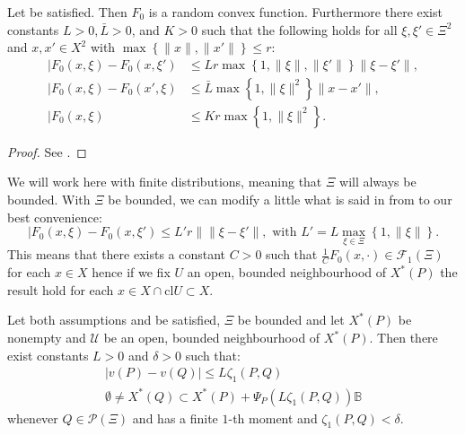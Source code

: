 \documentclass{amsart}
\begin{document}
\begin{proposition}\label{prop 2}
    Let  be satisfied. Then $F_0$ is a random convex function. Furthermore there exist constants $L>0, \bar{L}>0$, and $K>0$ such that the following holds for all $\xi,\xi'\in\Xi^2$ and $x,x'\in X^2$ with $\max\left\{\lVert x\rVert, \lVert x' \rVert\right\}\leq r$:
    \begin{align}
        \lvert F_0\left(x,\xi\right)- F_0\left(x,\xi'\right) &\leq Lr\max\left\{1,\lVert \xi\rVert, \lVert \xi'\rVert\right\}\lVert \xi-\xi'\rVert, \label{lips}\\
        \lvert F_0\left(x,\xi\right)- F_0\left(x',\xi\right) &\leq \bar{L}\max\left\{1,\lVert\xi\rVert^2\right\}\lVert x-x'\rVert, \\
        \lvert F_0\left(x,\xi\right) &\leq Kr\max\left\{1,\lVert\xi\rVert^2\right\}.
    \end{align}
     
\end{proposition}
\begin{proof}
    See \cite[Proposition 22]{romisch_stability_2003}.
\end{proof}
We will work here with finite distributions, meaning that $\Xi$ will always be bounded. With $\Xi$ be bounded, we can modify a little what is said in  from  to our best convenience:
$$
\lvert F_0\left(x,\xi\right)- F_0\left(x,\xi'\right) \leq L'r \lVert \lVert \xi-\xi'\rVert, \text{ with } L'=L\max_{\xi\in\Xi}\left\{1,\lVert\xi\rVert\right\}.
$$
This means that there exists a constant $C>0$ such that $\frac{1}{C}F_0\left(x,\cdot\right)\in\mathcal{F}_1\left(\Xi\right)$ for each $x\in X$ hence if we fix $U$ an open, bounded neighbourhood of $X^*\left(P\right)$ the result hold for each $x\in X\cap \text{cl}U\subset X$. 
\begin{corollary}
    Let both assumptions  and  be satisfied, $\Xi$ be bounded and let $X^*\left(P\right)$ be nonempty and $\mathcal{U}$ be an open, bounded neighbourhood of $X^*\left(P\right).$ Then there exist constants $L>0$ and $\delta >0$ such that:
    \begin{align*}
        \lvert v\left(P\right)-v\left(Q\right)\rvert \leq L\zeta_1\left(P,Q\right) \\
        \emptyset \ne X^*\left(Q\right)\subset X^*\left(P\right)+\Psi_P\left(L\zeta_1\left(P,Q\right)\right)\mathbb{B}
    \end{align*}
    whenever $Q\in\mathcal{P}\left(\Xi\right)$ and has a finite $1$-th moment and $\zeta_1\left(P,Q\right)<\delta$.
\end{corollary}
\end{document}
